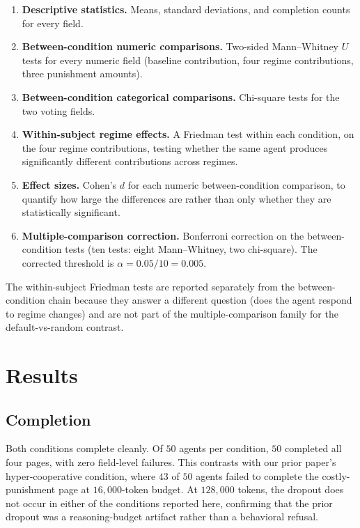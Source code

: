\documentclass[12pt, a4paper]{article}
\begin{document}
\begin{enumerate}
  \item \textbf{Descriptive statistics.} Means, standard deviations, and completion counts for every field.
  \item \textbf{Between-condition numeric comparisons.} Two-sided Mann--Whitney $U$ tests for every numeric field (baseline contribution, four regime contributions, three punishment amounts).
  \item \textbf{Between-condition categorical comparisons.} Chi-square tests for the two voting fields.
  \item \textbf{Within-subject regime effects.} A Friedman test within each condition, on the four regime contributions, testing whether the same agent produces significantly different contributions across regimes.
  \item \textbf{Effect sizes.} Cohen's $d$ for each numeric between-condition comparison, to quantify how large the differences are rather than only whether they are statistically significant.
  \item \textbf{Multiple-comparison correction.} Bonferroni correction on the between-condition tests (ten tests: eight Mann--Whitney, two chi-square). The corrected threshold is $\alpha=0.05/10=0.005$.
\end{enumerate}

The within-subject Friedman tests are reported separately from the between-condition chain because they answer a different question (does the agent respond to regime changes) and are not part of the multiple-comparison family for the default-vs-random contrast.

\section{Results}

\subsection{Completion}

Both conditions complete cleanly. Of $50$ agents per condition, $50$ completed all four pages, with zero field-level failures. This contrasts with our prior paper's hyper-cooperative condition, where $43$ of $50$ agents failed to complete the costly-punishment page at $16{,}000$-token budget. At $128{,}000$ tokens, the dropout does not occur in either of the conditions reported here, confirming that the prior dropout was a reasoning-budget artifact rather than a behavioral refusal.
\end{document}
